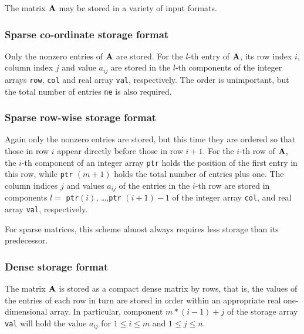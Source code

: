 \documentclass{galahad}
\begin{document}
\vspace*{-8mm}

\galmatrix
The matrix ${\mathbf{A}}$ may be stored in a variety of input formats.

\subsubsection{Sparse co-ordinate storage format}\label{coordinate}
Only the nonzero entries of ${\mathbf{A}}$ are stored.
For the $l$-th entry of ${\mathbf{A}}$,
its row index $i$, column index $j$ and value $a_{ij}$
are stored in the $l$-th components of the integer arrays {\tt row},
{\tt col} and real array {\tt val}, respectively.
The order is unimportant, but the total number of entries
{\tt ne} is also required.

\subsubsection{Sparse row-wise storage format}\label{rowwise}
Again only the nonzero entries are stored,
but this time they are ordered so that those in row $i$ appear directly
before those in row $i+1$. For the $i$-th row of ${\mathbf{A}}$, the $i$-th component
of an integer array {\tt ptr} holds the position of the first entry in this row,
while {\tt ptr} $(m+1)$ holds the total number of entries plus one.
The column indices $j$ and values $a_{ij}$ of the entries in the $i$-th row
are stored in components
$l =$ {\tt ptr}$(i)$, \ldots ,{\tt ptr} $(i+1)-1$ of the
integer array {\tt col}, and real array {\tt val}, respectively.

For sparse matrices, this scheme almost always requires less storage than
its predecessor.

\subsubsection{Dense storage format}\label{dense}
The matrix ${\mathbf{A}}$ is stored as a compact
dense matrix by rows, that is, the values of the entries of each row in turn are
stored in order within an appropriate real one-dimensional array.
In particular,
component $m \ast (i-1) + j$ of the storage array {\tt val}
will hold the value $a_{ij}$
for $1 \leq i \leq m$ and $1 \leq j \leq n$.



\end{document}
